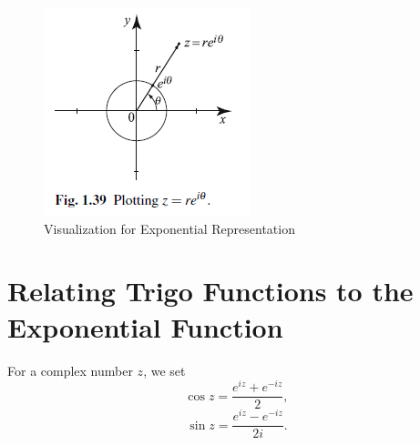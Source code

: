 \documentclass[11pt,reqno,oneside,a4paper]{article}
\begin{document}
\begin{figure}[htp]
	\centering
	\includegraphics[width=0.4\linewidth]{gfx/exponential-rep.png}
	\caption{Visualization for Exponential Representation}
	\label{fig:exp-rep}
\end{figure}

\section{Relating Trigo Functions to the Exponential Function}

\begin{defn}
	For a complex number $z$, we set
	$$\cos z = \frac{e^{iz} + e^{-iz}}{2},$$
	$$\sin z = \frac{e^{iz} - e^{-iz}}{2i}.$$
\end{defn}

{\small}
\end{document}
